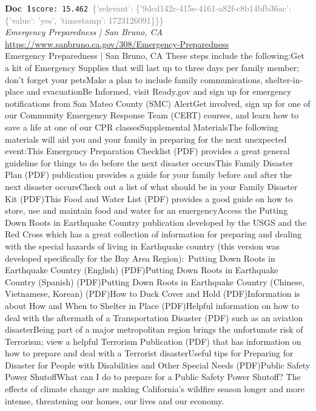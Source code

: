\documentclass[a4paper,11pt]{article}
\begin{document}
\begin{docenv}
{\footnotesize\textcolor{doccolor}{\textbf{Doc~1}}}\hfill{\tiny\texttt{score:~15.462}}\ {\tiny\textcolor{gray}{\{'relevant': \{'9dcd142c-415e-4161-a82f-c8b14bfb36ac': \{'value': 'yes', 'timestamp': 1723126091\}\}\}}}\\[3pt]
{\small\textit{Emergency Preparedness | San Bruno, CA}}\\[2pt]
{\tiny\url{https://www.sanbruno.ca.gov/308/Emergency-Preparedness}}\\[4pt]
{\footnotesize Emergency Preparedness | San Bruno, CA
These steps include the following:Get a kit of Emergency Supplies that will last up to three days per family member; don't forget your petsMake a plan to include family communications, shelter-in-place and evacuationBe Informed, visit Ready.gov and sign up for emergency notifications from San Mateo County (SMC) AlertGet involved, sign up for one of our Community Emergency Response Team (CERT) courses, and learn how to save a life at one of our CPR classesSupplemental MaterialsThe following materials will aid you and your family in preparing for the next unexpected event:This Emergency Preparation Checklist (PDF) provides a great general guideline for things to do before the next disaster occursThis Family Disaster Plan (PDF) publication provides a guide for your family before and after the next disaster occursCheck out a list of what should be in your Family Disaster Kit (PDF)This Food and Water List (PDF) provides a good guide on how to store, use and maintain food and water for an emergencyAccess the Putting Down Roots in Earthquake Country publication developed by the USGS and the Red Cross which has a great collection of information for preparing and dealing with the special hazards of living in Earthquake country (this version was developed specifically for the Bay Area Region): Putting Down Roots in Earthquake Country (English) (PDF)Putting Down Roots in Earthquake Country (Spanish) (PDF)Putting Down Roots in Earthquake Country (Chinese, Vietnamese, Korean) (PDF)How to Duck Cover and Hold (PDF)Information is about How and When to Shelter in Place (PDF)Helpful information on how to deal with the aftermath of a Transportation Disaster (PDF) such as an aviation disasterBeing part of a major metropolitan region brings the unfortunate risk of Terrorism; view a helpful Terrorism Publication (PDF) that has information on how to prepare and deal with a Terrorist disasterUseful tips for Preparing for Disaster for People with Disabilities and Other Special Needs (PDF)Public Safety Power ShutoffWhat can I do to prepare for a Public Safety Power Shutoff? The effects of climate change are making California's wildfire season longer and more intense, threatening our homes, our lives and our economy.}
\end{docenv}
\end{document}
